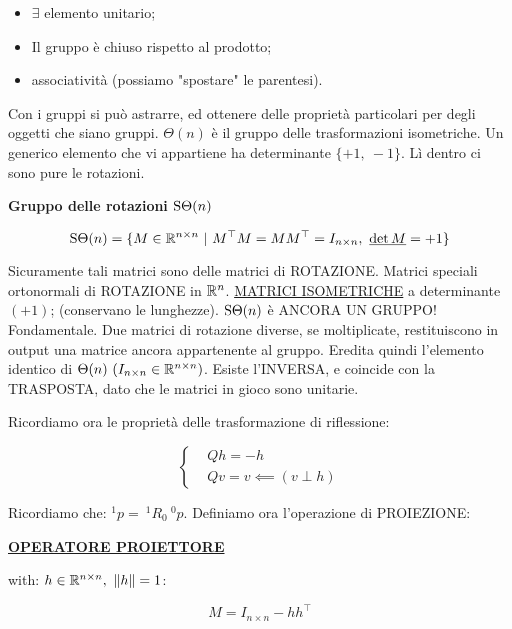 \begin{itemize}

\item $\exists$ elemento unitario;
\item Il gruppo è chiuso rispetto al prodotto;
\item associatività (possiamo "spostare" le parentesi).

\end{itemize}

Con i gruppi si può astrarre, ed ottenere delle proprietà particolari per degli oggetti che siano gruppi. $\Theta(n)$ è il gruppo delle trasformazioni isometriche. Un generico elemento che vi appartiene ha determinante $\{+1,\ -1\}$. Lì dentro ci sono pure le rotazioni.

\begin{defn}{\textbf{Gruppo delle rotazioni $\operatorname{S\Theta}(n)$}}

\[
	\operatorname{S\Theta}(n) = \{M\in\mathbb{R}^{n\times n}\ |\ M^\top M = MM^\top = I_{n\times n},\ \underline{\det{M}} = +1\}
\]

\end{defn}

Sicuramente tali matrici sono delle matrici di ROTAZIONE. Matrici speciali ortonormali di ROTAZIONE in $\mathbb{R}^n$. \underline{MATRICI ISOMETRICHE} a determinante $(+1)$; (conservano le lunghezze). $\operatorname{S\Theta}(n)$ è ANCORA UN GRUPPO! Fondamentale. Due matrici di rotazione diverse, se moltiplicate, restituiscono in output una matrice ancora appartenente al gruppo. Eredita quindi l'elemento identico di $\Theta(n)\ (I_{n\times n}\in\mathbb{R}^{n\times n})$. Esiste l'INVERSA, e coincide con la TRASPOSTA, dato che le matrici in gioco sono unitarie. 

Ricordiamo ora le proprietà delle trasformazione di riflessione:

\[	
	\left\{
	\begin{aligned}
	&Qh = -h\\
	&Qv = v \impliedby (v\perp h)
	\end{aligned}
	\right.
\]

Ricordiamo che: $^1p =\ ^1R_0\ ^0p$. Definiamo ora l'operazione di PROIEZIONE:

\begin{defn}{\textbf{\underline{OPERATORE PROIETTORE}}}

with: $h\in\R^{n\times n},\ \norma{h}=1$:

\[	
	M = I_{n\times n} - hh^\top
\]

\end{defn}


